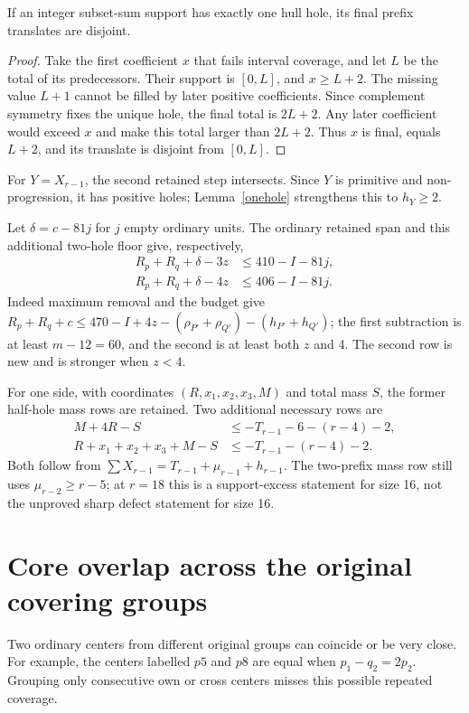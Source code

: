 \documentclass[11pt,a4paper]{article}
\begin{document}
\begin{lemma}\label{onehole}
If an integer subset-sum support has exactly one hull hole, its final
prefix translates are disjoint.
\end{lemma}
\begin{proof}
Take the first coefficient $x$ that fails interval coverage, and let $L$
be the total of its predecessors. Their support is $[0,L]$, and
$x\ge L+2$. The missing value $L+1$ cannot be filled by later positive
coefficients. Since complement symmetry fixes the unique hole, the final
total is $2L+2$. Any later coefficient would exceed $x$ and make this total
larger than $2L+2$. Thus $x$ is final, equals $L+2$, and its translate
is disjoint from $[0,L]$.
\end{proof}
For $Y=X_{r-1}$, the second retained step intersects. Since $Y$ is
primitive and non-progression, it has positive holes; Lemma~\ref{onehole}
strengthens this to $h_Y\ge2$.

Let $\delta=c-81j$ for $j$ empty ordinary units. The ordinary retained
span and this additional two-hole floor give, respectively,
\begin{align}
 R_p+R_q+\delta-3z&\le410-I-81j,\label{spanhalf}\\
 R_p+R_q+\delta-4z&\le406-I-81j.\label{span2}
\end{align}
Indeed maximum removal and the budget give
$R_p+R_q+c\le470-I+4z-(\rho_{P'}+\rho_{Q'})-(h_{P'}+h_{Q'})$;
the first subtraction is at least $m-12=60$, and the second is at least
both $z$ and 4. The second row is new and is stronger when $z<4$.

For one side, with coordinates $(R,x_1,x_2,x_3,M)$ and total mass $S$,
the former half-hole mass rows are retained. Two additional necessary rows are
\begin{align}
 M+4R-S&\le-T_{r-1}-6-(r-4)-2,\\
 R+x_1+x_2+x_3+M-S&\le-T_{r-1}-(r-4)-2.
\end{align}
Both follow from $\sum X_{r-1}=T_{r-1}+\mu_{r-1}+h_{r-1}$.
The two-prefix mass row still uses $\mu_{r-2}\ge r-5$; at $r=18$
this is a support-excess statement for size 16, not the unproved sharp
defect statement for size 16.

\section{Core overlap across the original covering groups}
Two ordinary centers from different original groups can coincide or be very
close.
For example, the centers labelled $p5$ and $p8$ are equal when
$p_1-q_2=2p_2$. Grouping only consecutive own or cross centers misses this
possible repeated coverage.
\end{document}
